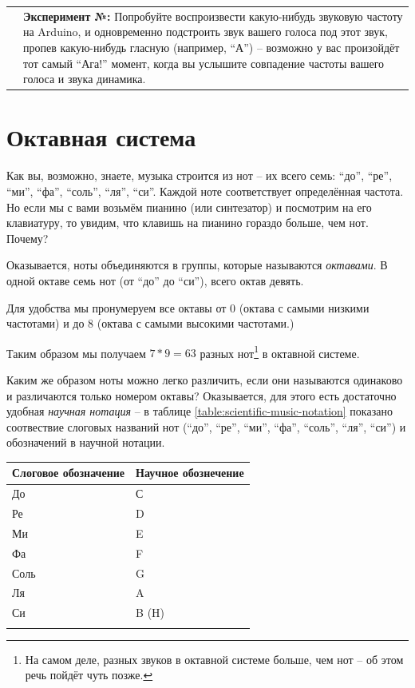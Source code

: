 \documentclass[a4paper,twoside]{book}
\newcounter{experiment-counter}
\newcommand{\experiment}[2]{
  \vspace{8pt}
  \begin{tabularx}{\textwidth}{m{1cm} m{9cm}}
    
    & \textbf{Эксперимент №\arabic{experiment-counter}:} #2 \\
  \end{tabularx}
  \addtocounter{experiment-counter}{1}
}
\begin{document}
\experiment{1}{ Попробуйте воспроизвести какую-нибудь звуковую частоту на Arduino,
  и одновременно подстроить звук вашего голоса под этот звук, пропев
  какую-нибудь гласную (например, ``А'') -- возможно у вас произойдёт тот самый
  ``Ага!'' момент, когда вы услышите совпадение частоты вашего голоса и звука
  динамика.}

\section{Октавная система}

Как вы, возможно, знаете, музыка строится из нот -- их всего семь: ``до'',
``ре'', ``ми'', ``фа'', ``соль'', ``ля'', ``си''. Каждой ноте соответствует
определённая частота. Но если мы с вами возьмём пианино (или синтезатор) и
посмотрим на его клавиатуру, то увидим, что клавишь на пианино гораздо больше,
чем нот.  Почему?

Оказывается, ноты объединяются в группы, которые называются \emph{октавами}. В
одной октаве семь нот (от ``до'' до ``си''), всего октав девять.

Для удобства мы пронумеруем все октавы от 0 (октава с самыми низкими частотами)
и до 8 (октава с самыми высокими частотами.)

Таким образом мы получаем $7 * 9 = 63$ разных нот\footnote{На самом деле, разных
звуков в октавной системе больше, чем нот -- об этом речь пойдёт чуть позже.} в
октавной системе.

Каким же образом ноты можно легко различить, если они называются одинаково и
различаются только номером октавы? Оказывается, для этого есть достаточно
удобная \emph{научная нотация} -- в таблице \ref{table:scientific-music-notation}
показано соотвествие слоговых названий нот (``до'', ``ре'', ``ми'', ``фа'',
``соль'', ``ля'', ``си'') и обозначений в научной нотации.

\begin{tabular}{p{4cm}|p{4cm}}
  Слоговое обозначение & Научное обознечение \\
  \hline \hline
  До   & С \\
  \hline
  Ре   & D \\
  \hline
  Ми   & E \\
  \hline
  Фа   & F \\
  \hline
  Соль & G \\
  \hline
  Ля   & A \\
  \hline
  Си   & B (H) \\
  \hline
  \label{table:scientific-music-notation}
\end{tabular}
\end{document}
